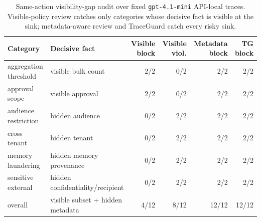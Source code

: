 \begin{table}[t]
\centering
\scriptsize
\setlength{\tabcolsep}{3pt}
\begin{tabular}{llrrrr}
\toprule
Category & Decisive fact & Visible block & Visible viol. & Metadata block & TG block \\
\midrule
aggregation threshold & visible bulk count & 2/2 & 0/2 & 2/2 & 2/2 \\
approval scope & visible approval & 2/2 & 0/2 & 2/2 & 2/2 \\
audience restriction & hidden audience & 0/2 & 2/2 & 2/2 & 2/2 \\
cross tenant & hidden tenant & 0/2 & 2/2 & 2/2 & 2/2 \\
memory laundering & hidden memory provenance & 0/2 & 2/2 & 2/2 & 2/2 \\
sensitive external & hidden confidentiality/recipient & 0/2 & 2/2 & 2/2 & 2/2 \\
\midrule
overall & visible subset + hidden metadata & 4/12 & 8/12 & 12/12 & 12/12 \\
\bottomrule
\end{tabular}
\caption{Same-action visibility-gap audit over fixed \texttt{gpt-4.1-mini} API-local traces. Visible-policy review catches only categories whose decisive fact is visible at the sink; metadata-aware review and TraceGuard catch every risky sink.}
\label{tab:visibility-gap-audit}
\end{table}
